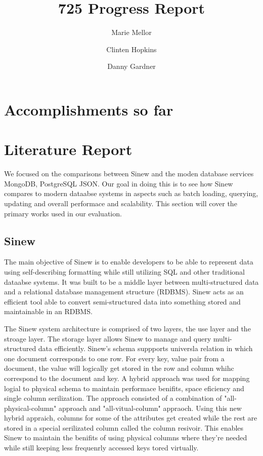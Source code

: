 \documentclass[sigconf]{acmart}
\begin{document}
\title{725 Progress Report}
\author{Marie Mellor \and Clinten Hopkins \and Danny Gardner}

\maketitle

\section{Accomplishments so far}

\section{Literature Report}
    We focused on the comparisons between Sinew and the moden database services MongoDB, PostgreSQL JSON. Our goal in doing this is to see how Sinew compares to modern dataabse systems in aspects such as batch loading, querying, updating and overall performace and scalability. This section will cover the primary works used in our evaluation. 

    \subsection{Sinew}

    The main objective of Sinew\cite{Tahara_Diamond_Abadi_2014} is to enable developers to be able to represent data using self-describing formatting while still utilizing SQL and other traditional dataabse systems. It was built to be a middle layer between multi-structured data and a relational database management structure (RDBMS). Sinew acts as an efficient tool able to convert semi-structured data into something stored and maintainable in an RDBMS. 

    The Sinew system architecture is comprised of two layers, the use layer and the stroage layer. The storage layer allows Sinew to manage and query multi-structured data efficiently. Sinew's schema suppports universla relation in which one document corresponds to one row. For every key, value pair from a document, the value will logically get stored in the row and column whihc correspond to the document and key. A hybrid approach was used for mapping logial to physical schema to maintain performace benifits, space eficiency and single column serilization. The approach consisted of a combination of "all-physical-column" approach and "all-vitual-column" appraoch. Using this new hybrid appraich, columns for some of the attributes get created while the rest are stored in a special serilizated column called the column resivoir. This enables Sinew to maintain the benifits of using physical columns where they're needed while still keeping less frequenrly accessed keys tored virtually. 
\end{document}
